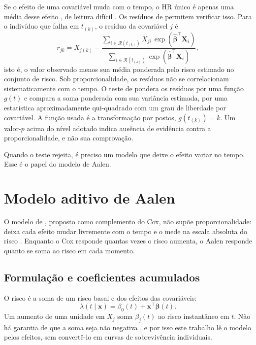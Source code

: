 Se o efeito de uma covariável muda com o tempo, o HR único é apenas uma média desse efeito \citep{van_houwelingen2007}, de leitura difícil \citep{royston2013}. Os resíduos de \citet{schoenfeld1982} permitem verificar isso. Para o indivíduo que falha em $t_{(k)}$, o resíduo da covariável $j$ é
\begin{equation}
    r_{jk}
    = X_{j(k)}
      - \frac{\displaystyle\sum_{i \in \mathcal{R}(t_{(k)})}
              X_{ji}\,\exp\!\left(\hat{\boldsymbol{\beta}}^{\top}\mathbf{X}_i\right)}
             {\displaystyle\sum_{i \in \mathcal{R}(t_{(k)})}
              \exp\!\left(\hat{\boldsymbol{\beta}}^{\top}\mathbf{X}_i\right)},
    \label{eq:schoenfeld}
\end{equation}
isto é, o valor observado menos sua média ponderada pelo risco estimado no conjunto de risco. Sob proporcionalidade, os resíduos não se correlacionam sistematicamente com o tempo. O teste de \citet{grambsch1994} pondera os resíduos por uma função $g(t)$ e compara a soma ponderada com sua variância estimada, por uma estatística aproximadamente qui-quadrado com um grau de liberdade por covariável. A função usada é a transformação por postos, $g(t_{(k)}) = k$. Um valor-$p$ acima do nível adotado indica ausência de evidência contra a proporcionalidade, e não sua comprovação.

Quando o teste rejeita, é preciso um modelo que deixe o efeito variar no tempo. Esse é o papel do modelo de Aalen.

\section{Modelo aditivo de Aalen}
\label{sec:aalen}

O modelo de \citet{aalen1980}, proposto como complemento do Cox, não supõe proporcionalidade: deixa cada efeito mudar livremente com o tempo e o mede na escala absoluta do risco \citep{martinussen2006}. Enquanto o Cox responde quantas vezes o risco aumenta, o Aalen responde quanto se soma ao risco em cada momento.

    \subsection{Formulação e coeficientes acumulados}
    \label{subsec:aalen_formulacao}

O risco é a soma de um risco basal e dos efeitos das covariáveis:
\begin{equation}
    \lambda\!\left(t \mid \mathbf{x}\right)
    = \beta_0(t) + \mathbf{x}^{\top}\boldsymbol{\beta}(t).
    \label{eq:aalen}
\end{equation}
Um aumento de uma unidade em $X_j$ soma $\beta_j(t)$ ao risco instantâneo em $t$. Não há garantia de que a soma seja não negativa \citep{aalen1980,martinussen2006}, e por isso este trabalho lê o modelo pelos efeitos, sem convertê-lo em curvas de sobrevivência individuais.

